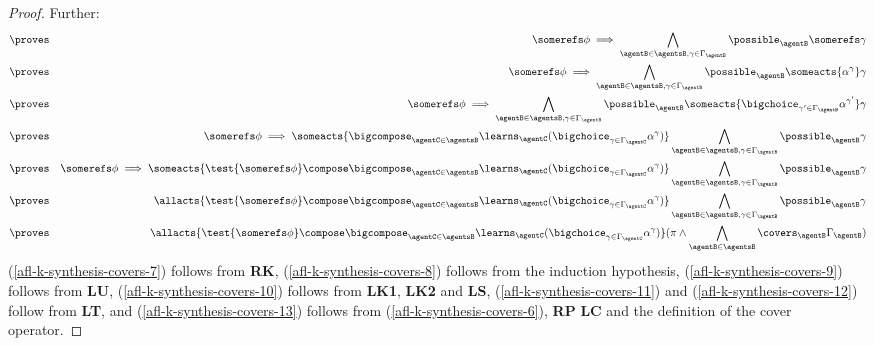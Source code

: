 \documentclass[twoside]{aiml14}
\begin{document}
\begin{proof}
      Further:
      \begin{eqnarray}
          &\proves& \somerefs \phi \implies \bigwedge_{\agentB \in \agentsB, \gamma \in \Gamma_\agentB} \possible_\agentB \somerefs \gamma\label{afl-k-synthesis-covers-7}\\
          &\proves& \somerefs \phi \implies \bigwedge_{\agentB \in \agentsB, \gamma \in \Gamma_\agentB} \possible_\agentB \someacts{\alpha^{\gamma}} \gamma\label{afl-k-synthesis-covers-8}\\
          &\proves& \somerefs \phi \implies \bigwedge_{\agentB \in \agentsB, \gamma \in \Gamma_\agentB} \possible_\agentB \someacts{\bigchoice_{\gamma' \in \Gamma_\agentB} \alpha^{\gamma'}} \gamma\label{afl-k-synthesis-covers-9}\\
          &\proves& \somerefs \phi \implies \someacts{\bigcompose_{\agentC \in \agentsB} \learns_\agentC (\bigchoice_{\gamma \in \Gamma_\agentC} \alpha^\gamma)} \bigwedge_{\agentB \in \agentsB, \gamma \in \Gamma_\agentB} \possible_\agentB \gamma\label{afl-k-synthesis-covers-10}\\
          &\proves& \somerefs \phi \implies \someacts{\test{\somerefs \phi} \compose \bigcompose_{\agentC \in \agentsB} \learns_\agentC (\bigchoice_{\gamma \in \Gamma_\agentC} \alpha^\gamma)} \bigwedge_{\agentB \in \agentsB, \gamma \in \Gamma_\agentB} \possible_\agentB \gamma\label{afl-k-synthesis-covers-11}\\
          &\proves& \allacts{\test{\somerefs \phi} \compose \bigcompose_{\agentC \in \agentsB} \learns_\agentC (\bigchoice_{\gamma \in \Gamma_\agentC} \alpha^\gamma)} \bigwedge_{\agentB \in \agentsB, \gamma \in \Gamma_\agentB} \possible_\agentB \gamma\label{afl-k-synthesis-covers-12}\\
          &\proves& \allacts{\test{\somerefs \phi} \compose \bigcompose_{\agentC \in \agentsB} \learns_\agentC (\bigchoice_{\gamma \in \Gamma_\agentC} \alpha^\gamma)} (\pi \land \bigwedge_{\agentB \in \agentsB} \covers_\agentB \Gamma_\agentB)\label{afl-k-synthesis-covers-13}
      \end{eqnarray}
      (\ref{afl-k-synthesis-covers-7}) follows from {\bf RK},
      (\ref{afl-k-synthesis-covers-8}) follows from the induction hypothesis,
      (\ref{afl-k-synthesis-covers-9}) follows from {\bf LU},
      (\ref{afl-k-synthesis-covers-10}) follows from {\bf LK1}, {\bf LK2} and {\bf LS},
      (\ref{afl-k-synthesis-covers-11}) and (\ref{afl-k-synthesis-covers-12}) follow from {\bf LT}, and
      (\ref{afl-k-synthesis-covers-13}) follows from (\ref{afl-k-synthesis-covers-6}), {\bf RP} {\bf LC} and the definition of the cover operator.


\end{proof}
\end{document}
